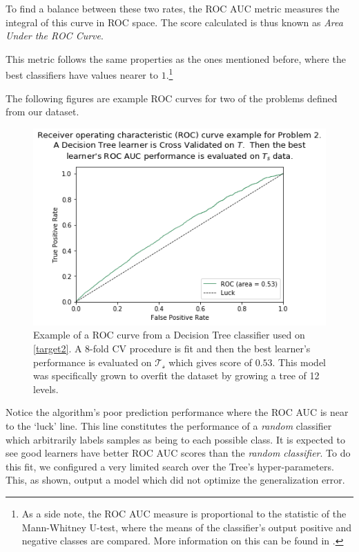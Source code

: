 To find a balance between these two rates, the ROC AUC metric measures the integral of this curve in ROC space.
The score calculated is thus known as \textit{Area Under the ROC Curve}.

This metric follows the same properties as the ones mentioned before, where the best classifiers have values nearer to $1$.\footnote{As a side note, the ROC AUC measure is proportional to the statistic of the Mann-Whitney U-test, where the means of the classifier's output positive and negative classes are compared.
More information on this can be found in \textcite{mason-rocAucRelationship}.}

The following figures are example ROC curves for two of the problems defined from our dataset.

\begin{figure}[h!]
\begin{center}
\includegraphics[width=1.2\columnwidth]{figures/figure-lowROCAUC/figure-lowROCAUC_original}
\caption{Example of a ROC curve from a Decision Tree classifier used on \cref{target2}. A 8-fold CV procedure is fit and then the best learner's performance is evaluated on $\mathcal{T_s}$ which gives score of $0.53$. This model was specifically grown to overfit the dataset by growing a tree of 12 levels.}
\label{fg:lowROCAUC}
\end{center}
\end{figure}

Notice the algorithm's poor prediction performance where the ROC AUC is near to the `luck' line.
This line constitutes the performance of a \textit{random} classifier which arbitrarily labels samples as being to each possible class.
It is expected to see good learners have better ROC AUC scores than the \textit{random classifier}.
To do this fit, we configured a very limited search over the Tree's hyper-parameters.
This, as shown, output a model which did not optimize the generalization error. 


